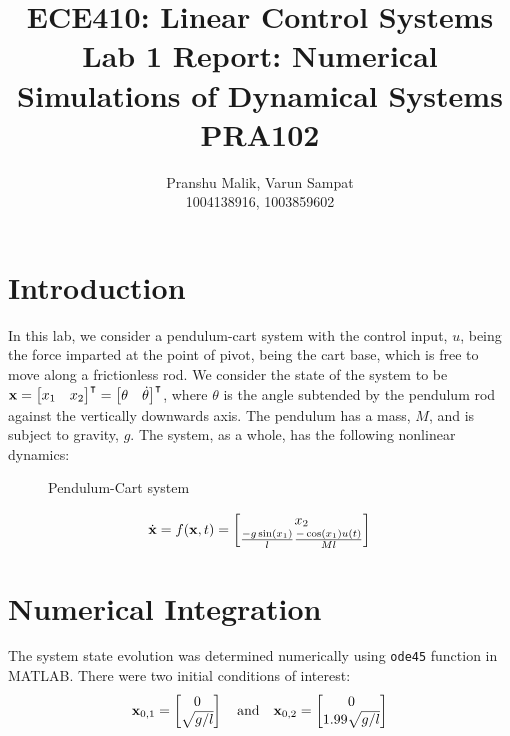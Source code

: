 \documentclass[10pt]{article}
\date{}
\begin{document}
\title{\textbf{\Large{\textsc{ECE410:} Linear Control Systems}} \\ \Large{Lab 1 Report: Numerical Simulations of Dynamical Systems} \\ \textbf{\small{PRA102}}\vspace{-0.3cm}}
\author{Pranshu Malik, Varun Sampat \\ \footnotesize{1004138916}, \footnotesize{1003859602}\vspace{-3cm}}

\maketitle

\section{Introduction}
In this lab, we consider a pendulum-cart system with the control input, $u$, being the force imparted at the point of pivot, being the cart base, which is free to move along a frictionless rod. We consider the state of the system to be $\mathbf{x} = \begin{bmatrix} x_1 & x_2 \end{bmatrix}^\intercal = \begin{bmatrix} \theta & \dot{\theta} \end{bmatrix}^\intercal$, where $\theta$ is the angle subtended by the pendulum rod against the vertically downwards axis. The pendulum has a mass, $M$, and is subject to gravity, $g$. The system, as a whole, has the following nonlinear dynamics:

\begin{figure}[!h]
\centering
\pendcartsimple
\caption{Pendulum-Cart system}
\end{figure}

\begin{equation}
    \dot{\mathbf{x}} = f(\mathbf{x}, t) = \begin{bmatrix}  x_2 \\ \frac{-g \sin(x_1)}{l} \frac{-\cos(x_1) u(t)}{Ml} \end{bmatrix}
\end{equation}

\section{Numerical Integration}
The system state evolution was determined numerically using \texttt{ode45} function in MATLAB. There were two initial conditions of interest:
\begin{equation}
    \mathbf{x}_{0,1} = \begin{bmatrix}  0\\ \sqrt{g/l}  \end{bmatrix}\quad \text{and} \quad \mathbf{x}_{0,2} =  \begin{bmatrix} 0\\1.99 \sqrt{g/l} \end{bmatrix}
\end{equation}
\end{document}
